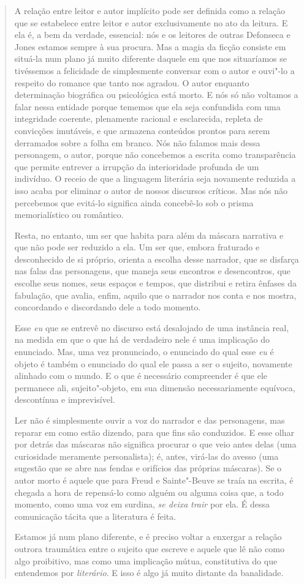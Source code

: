 \begin{quote}
A relação entre leitor e autor implícito pode ser definida como a
relação que se estabelece entre leitor e autor exclusivamente no ato da
leitura. E ela é, a bem da verdade, essencial: nós e os leitores de
outras Defonseca e Jones estamos sempre à sua procura. Mas a magia da
ficção consiste em situá-la num plano já muito diferente daquele em que
nos situaríamos se tivéssemos a felicidade de simplesmente conversar com
o autor e ouvi"-lo a respeito do romance que tanto nos agradou. O autor
enquanto determinação biográfica ou psicológica está morto. E nós só não
voltamos a falar nessa entidade porque tememos que ela seja confundida
com uma integridade coerente, plenamente racional e esclarecida, repleta
de convicções imutáveis, e que armazena conteúdos prontos para serem
derramados sobre a folha em branco. Nós não falamos mais dessa
personagem, o autor, porque não concebemos a escrita como transparência
que permite entrever a irrupção da interioridade profunda de um
indivíduo. O receio de que a linguagem literária seja novamente reduzida
a isso acaba por eliminar o autor de nossos discursos críticos. Mas nós
não percebemos que evitá-lo significa ainda concebê-lo sob o prisma
memorialístico ou romântico.

Resta, no entanto, um ser que habita para além da máscara narrativa e
que não pode ser reduzido a ela. Um ser que, embora fraturado e
desconhecido de si próprio, orienta a escolha desse narrador, que se
disfarça nas falas das personagens, que maneja seus encontros e
desencontros, que escolhe seus nomes, seus espaços e tempos, que
distribui e retira ênfases da fabulação, que avalia, enfim, aquilo que o
narrador nos conta e nos mostra, concordando e discordando dele a todo
momento.

Esse \emph{eu} que se entrevê no discurso está desalojado de uma
instância real, na medida em que o que há de verdadeiro nele é uma
implicação do enunciado. Mas, uma vez pronunciado, o enunciado do qual
esse \emph{eu} é objeto é também o enunciado do qual ele passa a ser o
sujeito, novamente alinhado com o mundo. E o que é necessário
compreender é que ele permanece ali, sujeito"-objeto, em sua dimensão
necessariamente equívoca, descontínua e imprevisível.

Ler não é simplesmente ouvir a voz do narrador e das personagens, mas
reparar em como estão dizendo, para que fins são conduzidos. E esse
olhar por detrás das máscaras não significa procurar o que veio antes
delas (uma curiosidade meramente personalista); é, antes, virá-las do
avesso (uma sugestão que se abre nas fendas e orifícios das próprias
máscaras). Se o autor morto é aquele que para Freud e Sainte"-Beuve se
traía na escrita, é chegada a hora de repensá-lo como alguém ou alguma
coisa que, a todo momento, como uma voz em surdina, \emph{se deixa}
\emph{trair} por ela. É dessa comunicação tácita que a literatura é
feita.

Estamos já num plano diferente, e é preciso voltar a enxergar a relação
outrora traumática entre o sujeito que escreve e aquele que lê não como
algo proibitivo, mas como uma implicação mútua, constitutiva do que
entendemos por \emph{literário}. E isso é algo já muito distante da
banalidade.
\end{quote}

